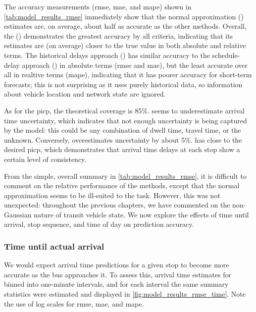 The accuracy measurements (\gls{rmse}, \gls{mae}, and \gls{mape}) shown in \cref{tab:model_results_rmse} immediately show that the normal approximation (\Fnorm{}) estimates are, on average, about half as accurate as the other methods. Overall, the \pf{} (\Fpf{}) demonstrates the greatest accuracy by all criteria, indicating that its estimates are (on average) closer to the true value in both absolute and relative terms. The historical delays approach (\Fhist{}) has similar accuracy to the schedule-delay approach (\Fsched{}) in absolute terms (\gls{rmse} and \gls{mae}), but the least accurate over all in realtive terms (\gls{mape}), indicating that it has poorer accuracy for short-term forecasts; this is not surprising as it uses purely historical data, so \rt{} information about vehicle location and network state are ignored.


As for the \gls{picp}, the theoretical coverage is 85\%. \Fpf{} seems to underestimate arrival time uncertainty, which indicates that not enough uncertainty is being captured by the model: this could be any combination of dwell time, travel time, or the unknown. Conversely, \Fnorm{} overestimates uncertainty by about 5\%. \Fhist{} has close to the desired \gls{picp}, which demonstrates that arrival time delays at each stop show a certain level of consistency.



From the simple, overall summary in \cref{tab:model_results_rmse}, it is difficult to comment on the relative performance of the methods, except that the normal approximation seems to be ill-suited to the task. However, this was not unexpected: throughout the previous chapters, we have commented on the non-Gaussian nature of transit vehicle state. We now explore the effects of time until arrival, stop sequence, and time of day on prediction accuracy.


\subsubsection{Time until actual arrival}

We would expect arrival time predictions for a given stop to become more accurate as the bus approaches it. To assess this, arrival time estimates for binned into one-minute intervals, and for each interval the same summary statistics were estimated and displayed in \cref{fig:model_results_rmse_time}. Note the use of log scales for \gls{rmse}, \gls{mae}, and \gls{mape}.



